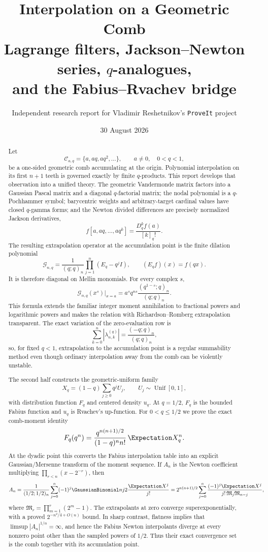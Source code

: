 \documentclass[11pt,a4paper,oneside]{article}
\title{\bfseries Interpolation on a Geometric Comb\\[0.4em]
\large Lagrange filters, Jackson--Newton series, $q$-analogues,\\
and the Fabius--Rvachev bridge}
\author{Independent research report for Vladimir Reshetnikov's \texttt{ProveIt} project}
\date{30 August 2026}
\theoremstyle{definition}
\theoremstyle{remark}
\begin{document}
\maketitle

\begin{abstract}
Let
\[
  \mathcal C_{a,q}=\{a,aq,aq^2,\ldots\},\qquad a\ne0,\quad 0<q<1,
\]
be a one-sided geometric comb accumulating at the origin.  Polynomial
interpolation on its first $n+1$ teeth is governed exactly by finite
$q$-products.  This report develops that observation into a unified theory.
The geometric Vandermonde matrix factors into a Gaussian Pascal matrix and a
diagonal $q$-factorial matrix; the nodal polynomial is a $q$-Pochhammer
symbol; barycentric weights and arbitrary-target cardinal values have closed
$q$-gamma forms; and the Newton divided differences are precisely normalized
Jackson derivatives,
\[
 f[a,aq,\ldots,aq^k]=\frac{D_q^k f(a)}{[k]_q!}.
\]
The resulting extrapolation operator at the accumulation point is the finite
dilation polynomial
\[
 \mathcal G_{n,q}=\frac1{(q;q)_n}\prod_{j=1}^n(E_q-q^jI),
 \qquad (E_qf)(x)=f(qx).
\]
It is therefore diagonal on Mellin monomials.  For every complex $s$,
\[
 \mathcal G_{n,q}(x^s)\big|_{x=a}
 =a^s q^{ns}\frac{(q^{1-s};q)_n}{(q;q)_n}.
\]
This formula extends the familiar integer moment annihilation to fractional
powers and logarithmic powers and makes the relation with Richardson--Romberg
extrapolation transparent.  The exact variation of the zero-evaluation row is
\[
 \sum_{k=0}^n|\lambda_{n,k}^{(q)}|
 =\frac{(-q;q)_n}{(q;q)_n},
\]
so, for fixed $q<1$, extrapolation to the accumulation point is a regular
summability method even though ordinary interpolation away from the comb can
be violently unstable.

The second half constructs the geometric-uniform family
\[
 X_q=(1-q)\sum_{j\ge0}q^jU_j,
 \qquad U_j\sim\operatorname{Unif}[0,1],
\]
with distribution function $F_q$ and centered density $u_q$.  At $q=1/2$,
$F_q$ is the bounded Fabius function and $u_q$ is Rvachev's up-function.  For
$0<q\le1/2$ we prove the exact comb-moment identity
\[
 F_q(q^n)=\frac{q^{n(n+1)/2}}{(1-q)^n n!}\,\Expectation X_q^n.
\]
At the dyadic point this converts the Fabius interpolation table into an
explicit Gaussian/Mersenne transform of the moment sequence.  If $A_n$ is the
Newton coefficient multiplying $\prod_{r<n}(x-2^{-r})$, then
\[
 A_n=\frac1{(1/2;1/2)_n}
 \sum_{j=0}^n(-1)^j\GaussianBinomial nj2\frac{\Expectation X^j}{j!}
 =2^{n(n+1)/2}\sum_{j=0}^n
 \frac{(-1)^j\Expectation X^j}{j!\,\mathfrak M_j\mathfrak M_{n-j}},
\]
where $\mathfrak M_r=\prod_{m=1}^r(2^m-1)$.  The extrapolants at zero converge
superexponentially, with a proved $2^{-n^2/4+O(n)}$ bound.  In sharp contrast,
flatness implies that $\limsup|A_n|^{1/n}=\infty$, and hence the Fabius
Newton interpolants diverge at every nonzero point other than the sampled
powers of $1/2$.  Thus their exact convergence set is the comb together with
its accumulation point.


\end{abstract}
\end{document}
